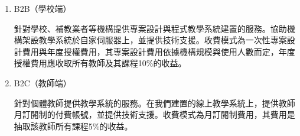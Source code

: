 \begin{enumerate}
  \setlength{\parindent}{2em}
  \item B2B（學校端）
  \par 針對學校、補教業者等機構提供專案設計與程式教學系統建置的服務。協助機構架設教學系統於自家伺服器上，並提供技術支援。收費模式為一次性專案設計費用與年度授權費用，其專案設計費用依據機構規模與使用人數而定，年度授權費用應收取所有教師及其課程10\%的收益。
  \item B2C（教師端）
  \par 針對個體教師提供教學系統的服務。在我們建置的線上教學系統上，提供教師月訂閱制的付費帳號，並提供技術支援。收費模式為月訂閱制費用，其費用是抽取該教師所有課程5\%的收益。
\end{enumerate}